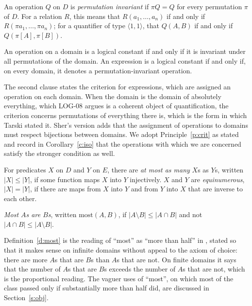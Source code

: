 \documentclass{situationist-preprint}
\begin{document}
\begin{definition}\label{d:inv}
An operation $Q$ on $D$ is \emph{permutation invariant} if $\pi Q = Q$ for every permutation $\pi$ of $D$. For a relation $R$, this means that $R(a_1, \ldots, a_n)$ if and only if $R(\pi a_1, \ldots, \pi a_n)$; for a quantifier of type $\langle 1, 1\rangle$, that $Q(A, B)$ if and only if $Q(\pi[A], \pi[B])$.
\end{definition}

\begin{principle}\label{p:crit}
An operation on a domain is a logical constant if and only if it is invariant under all permutations of the domain. An expression is a logical constant if and only if, on every domain, it denotes a permutation-invariant operation.
\end{principle}

The second clause states the criterion for expressions, which are assigned an operation on each domain. When the domain is the domain of absolutely everything, which LOG-08 argues is a coherent object of quantification, the criterion concerns permutations of everything there is, which is the form in which Tarski stated it. Sher's version adds that the assignment of operations to domains must respect bijections between domains. We adopt Principle~\ref{p:crit} as stated and record in Corollary~\ref{c:iso} that the operations with which we are concerned satisfy the stronger condition as well.

\begin{definition}\label{d:card}
For predicates $X$ on $D$ and $Y$ on $E$, there are \emph{at most as many} $X$s as $Y$s, written $|X| \leq |Y|$, if some function maps $X$ into $Y$ injectively. $X$ and $Y$ are \emph{equinumerous}, $|X| = |Y|$, if there are maps from $X$ into $Y$ and from $Y$ into $X$ that are inverse to each other.
\end{definition}

\begin{definition}\label{d:most}
\emph{Most $A$s are $B$s}, written $\mathrm{most}(A, B)$, if $|A \setminus B| \leq |A \cap B|$ and not $|A \cap B| \leq |A \setminus B|$.
\end{definition}

Definition~\ref{d:most} is the reading of \enquote{most} as \enquote{more than half} in \citet{BarwiseCooper1981}, stated so that it makes sense on infinite domains without appeal to the axiom of choice: there are more $A$s that are $B$s than $A$s that are not. On finite domains it says that the number of $A$s that are $B$s exceeds the number of $A$s that are not, which is the proportional reading. The vaguer uses of \enquote{most}, on which most of the class passed only if substantially more than half did, are discussed in Section~\ref{s:obj}.
\end{document}
